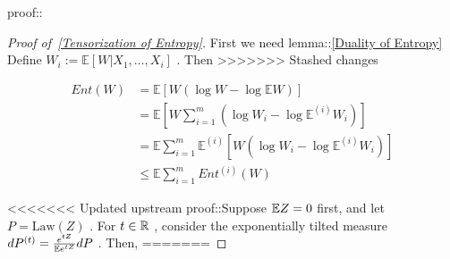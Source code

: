 \documentclass{article}
\begin{document}
proof::
\begin{proof}[Proof of~{\autoref{Tensorization of Entropy}}]
\label{proof:Tensorization of Entropy}
First we need lemma::\autoref{Duality of Entropy} Define  $W_i := \mathbb{E}[W| X_1, \dots, X_i]$ . Then
>>>>>>> Stashed changes


\begin{align*}
Ent(W) &= \mathbb{E}\left[ W (\log W - \log \mathbb{E}W) \right]\\
& = \mathbb{E}\left[ W \sum_{i=1}^m (\log W_i - \log\mathbb{E}^{(i)} W_i) \right]\\
& = \mathbb{E} \sum_{i=1}^m \mathbb{E}^{(i)}[W (\log W_i - \log \mathbb{E}^{(i)} W_i)]\\
& \leq \mathbb{E} \sum_{i=1}^m Ent^{(i)}(W)
\end{align*}


<<<<<<< Updated upstream
proof::Suppose  $\mathbb{E} Z = 0$  first, and let  $P = \mathrm{Law}(Z)$ . For  $t\in \mathbb{R}$ , consider the exponentially tilted measure  $dP^{(t)} = \frac{e^{tZ}}{\mathbb{E} e^{tZ}} dP$ . Then,
=======
\end{proof}
\end{document}
